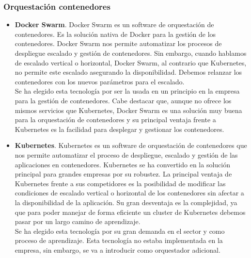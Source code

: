 \subsubsection{Orquestación contenedores}
\begin{itemize}
	\item \textbf{Docker Swarm}. Docker Swarm es un software de orquestación de contenedores. Es la solución nativa de Docker para la gestión de los contenedores. Docker Swarm nos permite automatizar los procesos de despliegue escalado y gestión de contenedores. Sin embargo, cuando hablamos de escalado vertical o horizontal, Docker Swarm, al contrario que Kubernetes, no permite este escalado asegurando la disponibilidad. Debemos relanzar los contenedores con los nuevos parámetros para el escalado. \\
	Se ha elegido esta tecnología por ser la usada en un principio en la empresa para la gestión de contenedores. Cabe destacar que, aunque no ofrece los mismos servicios que Kubernetes, Docker Swarm es una solución muy buena para la orquestación de contenedores y su principal ventaja frente a Kubernetes es la facilidad para desplegar y gestionar los contenedores.
	\item \textbf{Kubernetes}. Kubernetes es un software de orquestación de contenedores que nos permite automatizar el proceso de despliegue, escalado y gestión de las aplicaciones en contenedores. Kubernetes se ha convertido en la solución principal para grandes empresas por su robustez. La principal ventaja de Kubernetes frente a sus competidores es la posibilidad de modificar las condiciones de escalado vertical o horizontal de los contenedores sin afectar a la disponibilidad de la aplicación. Su gran desventaja es la complejidad, ya que para poder manejar de forma eficiente un cluster de Kubernetes debemos pasar por un largo camino de aprendizaje. \\
	Se ha elegido esta tecnología por su gran demanda en el sector y como proceso de aprendizaje. Esta tecnología no estaba implementada en la empresa, sin embargo, se va a introducir como orquestador adicional.
\end{itemize}

